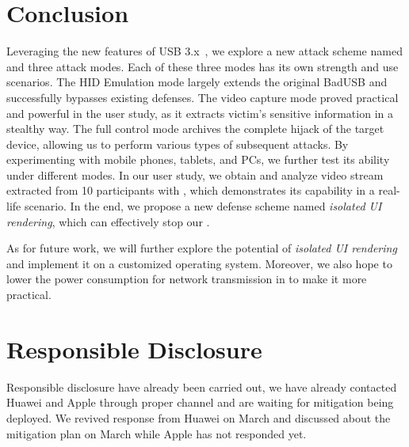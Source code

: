 \section{Conclusion}
\label{sec:conclusion}

Leveraging the new features of \ac{USB} 3.x~\cite{usb30,usb31,usb32}, we explore a
new attack scheme named \tool and three attack modes. Each of these three modes
has its own strength and use scenarios. The \ac{HID} Emulation mode largely extends the
original BadUSB and successfully bypasses existing defenses. The video capture mode proved practical and powerful in the user study, as it extracts
victim's sensitive information in a stealthy way. The full control mode
archives the complete hijack of the target device, allowing us to perform various
types of subsequent attacks. By experimenting \tool with mobile phones, tablets,
and PCs, we further test its ability under different modes. In our user study, we
obtain and analyze video stream extracted from 10 participants with \tool,
which demonstrates its capability in a real-life scenario. In the end, we
propose a new defense scheme named \textit{isolated UI rendering}, which can
effectively stop our \tool.

As for future work, we will further explore the potential of \textit{isolated UI
rendering} and implement it on a customized operating system. Moreover, we also
hope to lower the power consumption for network transmission in \tool to make
it more practical.

\section{Responsible Disclosure}

Responsible disclosure have already been carried out, we have already contacted Huawei and Apple through proper channel and are waiting for mitigation being deployed. We revived response from Huawei on  March and discussed about the mitigation plan on  March while Apple has not responded yet.